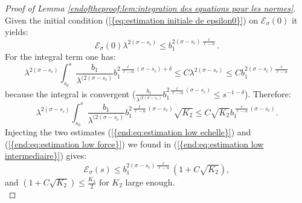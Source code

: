 \documentclass[11pt,a4paper,reqno]{amsart}
\theoremstyle{remark}
\numberwithin{equation}{section}
\begin{document}
\begin{proof}[ Proof of Lemma \ref{endoftheproof:lem:integration des equations pour les normes}]
$$$$
Given the initial condition {{\rm (\ref{{eq:estimation initiale de epsilon0}})}} on $\mathcal{E}_{\sigma}(0)$ it yields:
\begin{equation} \label{end:eq:estimation low echelle}
\mathcal{E}_{\sigma}(0)\lambda^{2(\sigma-s_c)}\leq b_1^{2(\sigma-s_c)\frac{\ell}{\ell-\alpha}}.
\end{equation}
For the integral term one has:
$$
\lambda^{2(\sigma-s_c)}\int_{s_0}^s \frac{b_1}{\lambda^{(2(\sigma-s_c)}}b_1^{2\frac{\ell}{\ell-\alpha}(\sigma-s_c)+\delta} \leq C\lambda^{2(\sigma-s_c)}\leq C b_1^{2(\sigma-s_c)\frac{\ell}{\ell-\alpha}}
$$
because the integral is convergent ($\frac{b_1}{\lambda^{(2(\sigma-s_c)}}b_1^{2\frac{\ell}{\ell-\alpha}(\sigma-s_c)}\leq s^{-1-\delta}$). Therefore:
\begin{equation} \label{end:eq:estimation low force}
\lambda^{2(\sigma-s_c)}\int_{s_0}^s \frac{b_1}{\lambda^{(2(\sigma-s_c)}}b_1^{2\frac{\ell}{\ell-\alpha}(\sigma-s_c)}\sqrt{K_2}\leq C \sqrt{K_2}b_1^{\frac{\ell}{\ell-\alpha}(\sigma-s_c)} .
\end{equation}
Injecting the two estimates {{\rm (\ref{{end:eq:estimation low echelle}})}} and {{\rm (\ref{{end:eq:estimation low force}})}} we found in {{\rm (\ref{{end:eq:estimation low intermediaire}})}} gives:
$$
\mathcal{E}_{\sigma}(s)\leq b_1^{2(\sigma-s_c)\frac{\ell}{\ell-\alpha}}\left( 1+C\sqrt{K_2}\right) ,
$$
and $\left( 1+C\sqrt{K_2}\right)\leq \frac{K_2}{2}$ for $K_2$ large enough.\\


\end{proof}
\end{document}

